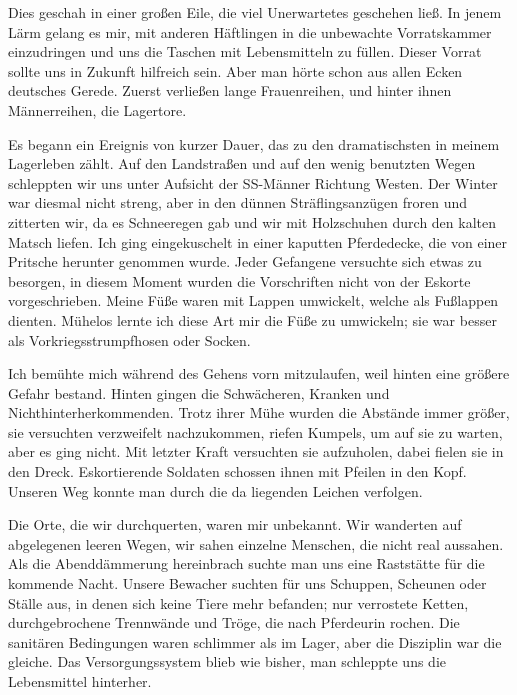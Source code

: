Dies geschah in einer großen Eile, die viel Unerwartetes geschehen ließ. In jenem Lärm gelang es mir, mit anderen Häftlingen in die unbewachte Vorratskammer einzudringen und uns die Taschen mit Lebensmitteln zu füllen. Dieser Vorrat sollte uns in Zukunft hilfreich sein. Aber man hörte schon aus allen Ecken deutsches Gerede. Zuerst verließen lange Frauenreihen, und hinter ihnen Männerreihen, die Lagertore.

Es begann ein Ereignis von kurzer Dauer, das zu den dramatischsten in meinem Lagerleben zählt. Auf den Landstraßen und auf den wenig benutzten Wegen schleppten wir uns unter Aufsicht der SS-Männer Richtung Westen. Der Winter war diesmal nicht streng, aber in den dünnen Sträflingsanzügen froren und zitterten wir, da es Schneeregen gab und wir mit Holzschuhen durch den kalten Matsch liefen. Ich ging eingekuschelt in einer kaputten Pferdedecke, die von einer Pritsche herunter genommen wurde. Jeder Gefangene versuchte sich etwas zu besorgen, in diesem Moment wurden die Vorschriften nicht von der Eskorte vorgeschrieben. Meine Füße waren mit Lappen umwickelt, welche als Fußlappen dienten. Mühelos lernte ich diese Art mir die Füße zu umwickeln; sie war besser als Vorkriegsstrumpfhosen oder Socken.

Ich bemühte mich während des Gehens vorn mitzulaufen, weil hinten eine größere Gefahr bestand. Hinten gingen die Schwächeren, Kranken und Nichthinterherkommenden. Trotz ihrer Mühe wurden die Abstände immer größer, sie versuchten verzweifelt nachzukommen, riefen Kumpels, um auf sie zu warten, aber es ging nicht. Mit letzter Kraft versuchten sie aufzuholen, dabei fielen sie in den Dreck. Eskortierende Soldaten schossen ihnen mit Pfeilen in den Kopf. Unseren Weg konnte man durch die da liegenden Leichen verfolgen.

Die Orte, die wir durchquerten, waren mir unbekannt. Wir wanderten auf abgelegenen leeren Wegen, wir sahen einzelne Menschen, die nicht real aussahen. Als die Abenddämmerung hereinbrach suchte man uns eine Raststätte für die kommende Nacht. Unsere Bewacher suchten für uns Schuppen, Scheunen oder Ställe aus, in denen sich keine Tiere mehr befanden; nur verrostete Ketten, durchgebrochene Trennwände und Tröge, die nach Pferdeurin rochen. Die sanitären Bedingungen waren schlimmer als im Lager, aber die Disziplin war die gleiche. Das Versorgungssystem blieb wie bisher, man schleppte uns die Lebensmittel hinterher.

